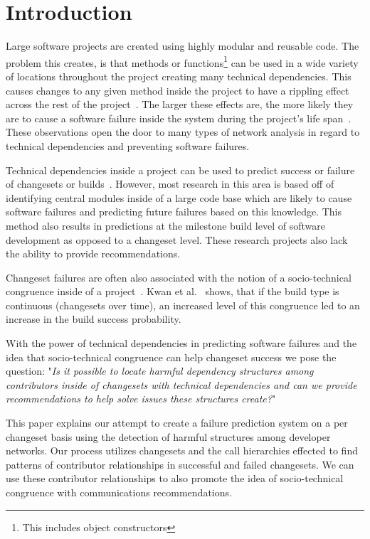 \documentclass[conference]{IEEEtran}
\begin{document}
\section{Introduction}

Large software projects are created using highly modular and 
reusable code. The problem this creates, is that methods or functions\footnote{This includes object constructors} 
can be used in a wide variety of locations throughout the project creating many technical 
dependencies.  This causes changes to any given method inside the project to have a rippling 
effect across the rest of the project~\cite{Acharya:2011:PCI}. The larger these effects are,
the more likely they are to cause a software failure inside the system during the project's
life span~\cite{Zimmermann:2008:PDU}. These observations open the door to many types
of network analysis in regard to technical dependencies and preventing software failures.

Technical dependencies inside a project can be used to predict success or failure of 
changesets or builds~\cite{Pinzger:2008:DNP, Zimmermann:2008:PDU}. However, most 
research in this area is based off of identifying
central modules inside of a large code base which are likely to cause software failures and 
predicting future failures based on this knowledge. This method also results in predictions 
at the milestone build level of software development as opposed to a changeset level.
These research projects also lack the ability to provide recommendations.

Changeset failures are often also associated with the notion of a socio-technical 
congruence inside of a project~\cite{Conway:1968}. Kwan et al.~\cite{Kwan:2011:SD} shows, 
that if the build type is continuous (changesets over time), an increased level of this
congruence led to an increase in the build success probability.

With the power of technical dependencies in predicting software failures and the idea
that socio-technical congruence can help changeset success we pose the question: 
"\textit{Is it possible to locate harmful dependency structures among contributors inside
of changesets with technical dependencies and can we provide recommendations to help
solve issues these structures create?}"

This paper explains our attempt to create a failure prediction system on a per changeset basis using
the detection of harmful structures among developer networks.
Our process utilizes changesets and the call hierarchies effected  to find patterns of contributor 
relationships in successful and failed changesets.  We can use these contributor relationships 
to also promote the idea of socio-technical congruence with communications recommendations.
\end{document}
